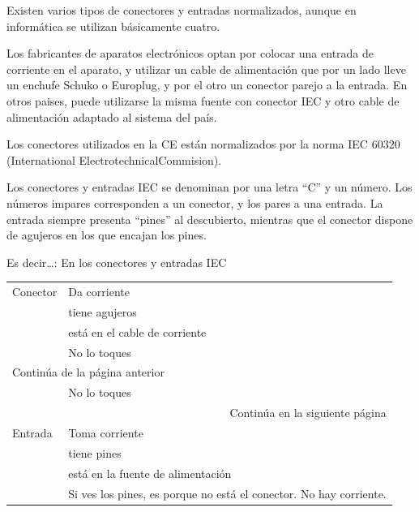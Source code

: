 \documentclass{article}
\begin{document}
Existen varios tipos de conectores y entradas normalizados, aunque en informática se utilizan básicamente cuatro.

Los fabricantes de aparatos electrónicos optan por colocar una entrada de corriente en el aparato, y utilizar un cable de alimentación que por un lado lleve un enchufe Schuko o Europlug, y por el otro un conector parejo a la entrada. En otros paises, puede utilizarse la misma fuente con conector IEC y otro cable de alimentación adaptado al sistema del país.

Los conectores utilizados en la CE están normalizados por la norma IEC 60320 (International ElectrotechnicalCommision).  

Los conectores y entradas IEC  se denominan por una letra “C” y un número. Los números impares corresponden a un conector, y los pares a una entrada. La entrada siempre presenta “pines” al descubierto, mientras que el conector dispone de agujeros en los que encajan los pines. 

Es decir\ldots{}: En los conectores y entradas IEC

\begin{longtable}{ll}
\hline
Conector & Da corriente\\
 & tiene agujeros\\
 & está en el cable de corriente\\
 & No lo toques\\
\hline
\endfirsthead
\multicolumn{2}{l}{Continúa de la página anterior} \\

 & No lo toques \\

\hline
\endhead
\hline\multicolumn{2}{r}{Continúa en la siguiente página} \\
\endfoot
\endlastfoot
\hline
Entrada & Toma corriente\\
 & tiene pines\\
 & está en la fuente de alimentación\\
 & Si ves los pines, es porque no está el conector. No hay corriente.\\
\hline
\end{longtable}
\end{document}
